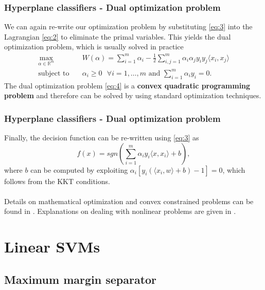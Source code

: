 \documentclass{beamer}
\begin{document}
\begin{frame}{}
    \frametitle{Hyperplane classifiers - Dual optimization problem}
    We can again re-write our optimization problem by substituting \eqref{eq:3} into the Lagrangian \eqref{eq:2} to eliminate the primal variables. This yields the dual optimization problem, which is usually solved in practice
    \begin{equation} \label{eq:4}
        \begin{aligned}
            \max_{\alpha \in \mathbb{R}^m} \quad & W(\alpha) = \sum_{i=1}^{m} \alpha_i - \frac{1}{2} \sum_{i,j=1}^{m} \alpha_i \alpha_j y_i y_j \langle x_i,x_j \rangle \\
            \textrm{subject to} \quad & \alpha_i \geq 0 \text{ } \forall i = {1, \dots, m} \text{ and } \sum_{i=1}^{m} \alpha_i y_i = 0. 
        \end{aligned}
    \end{equation}
    The dual optimization problem \eqref{eq:4} is a \textbf{convex quadratic programming problem} and therefore can be solved by using standard optimization techniques.
\end{frame}


\begin{frame}{}
    \frametitle{Hyperplane classifiers - Dual optimization problem}
    Finally, the decision function can be re-written using \eqref{eq:3} as
    \begin{equation} \label{eq:5}
        f(x) = sgn \left( \sum_{i=1}^{m} \alpha_i y_i \langle x,x_i \rangle + b \right),
    \end{equation}
    where $b$ can be computed by exploiting $\alpha_i \left[ y_i \left( \langle x_i,w \rangle + b \right) - 1 \right] = 0$, which follows from the KKT conditions. \\~\\
    Details on mathematical optimization and convex constrained problems can be found in \cite{Jarre}. Explanations on dealing with nonlinear problems are given in \cite{Reinhardt}.
\end{frame}



\section{Linear SVMs}

\subsection{Maximum margin separator}
\end{document}
